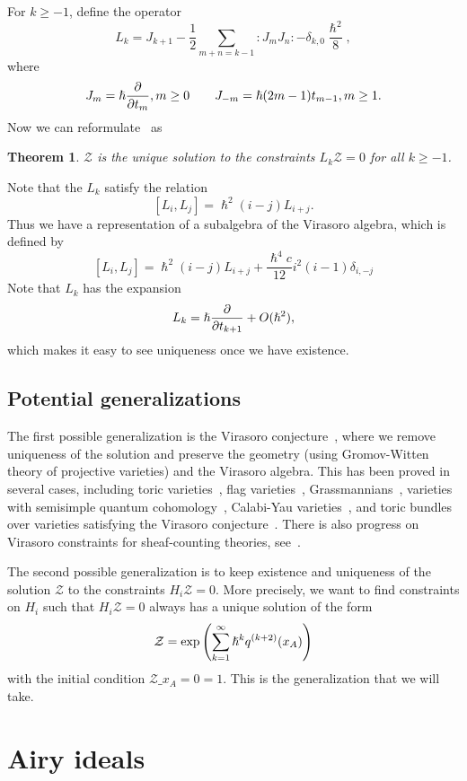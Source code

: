 \documentclass[leqno, openany]{memoir}
\theoremstyle{definition}
\theoremstyle{remark}
\theoremstyle{plain}
\newtheorem*{thm*}{Theorem}
\theoremstyle{definition}
\theoremstyle{remark}
\newcommand{\mc}[1]{\mathcal{#1}}
\begin{document}
For $k \geq -1$, define the operator
\[ L_k = J_{k+1} - \frac{1}{2} \sum_{m+n=k-1} :J_m J_n: - \delta_{k,0} \frac{\hslash^2}{8}, \]
where
\[ J_m = \hslash \pdv{t_m}, m \geq 0 \qquad J_{-m} = \hslash(2m-1)t_{m-1}, m \geq 1. \]
Now we can reformulate~ as
\begin{thm*}
    $\mc{Z}$ is the unique solution to the constraints $L_k \mc{Z} = 0$ for all $k \geq -1$.
\end{thm*}

Note that the $L_k$ satisfy the relation
\[ [L_i, L_j] = \hslash^2(i-j)L_{i+j}. \]
Thus we have a representation of a subalgebra of the Virasoro algebra, which is defined by
\[ [L_i, L_j] = \hslash^2(i-j)L_{i+j} + \frac{\hslash^4 c}{12} i^2(i-1) \delta_{i, -j} \]
Note that $L_k$ has the expansion
\[ L_k = \hslash \pdv{t_{k+1}} + O(\hslash^2), \]
which makes it easy to see uniqueness once we have existence.

\subsection{Potential generalizations}

The first possible generalization is the Virasoro conjecture~\cite{virasoroconj}, where we remove uniqueness of the solution and preserve the geometry (using Gromov-Witten theory of projective varieties) and the Virasoro algebra. This has been proved in several cases, including toric varieties~\cites{virasorofanotoric}{virasorotoric}, flag varieties~\cite{virasoroflag}, Grassmannians~\cite{virasorograss}, varieties with semisimple quantum cohomology~\cite{2dsscohft}, Calabi-Yau varieties~\cite{virasorogw}, and toric bundles over varieties satisfying the Virasoro conjecture~\cite{virasorotoricbundle}. There is also progress on Virasoro constraints for sheaf-counting theories, see~\cite{virasoropt}.

The second possible generalization is to keep existence and uniqueness of the solution $\mc{Z}$ to the constraints $H_i \mc{Z} = 0$. More precisely, we want to find constraints on $H_i$ such that $H_i \mc{Z} = 0$ always has a unique solution of the form
\[ \mc{Z} = \exp \qty(\sum_{k=1}^{\infty} \hslash^k q^{(k+2)}(x_A)) \]
with the initial condition $\mc{Z} \_{x_A = 0} = 1$. This is the generalization that we will take.

\section{Airy ideals}
\end{document}
